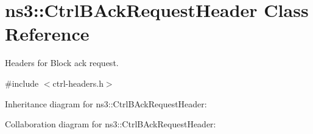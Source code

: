 \hypertarget{classns3_1_1CtrlBAckRequestHeader}{}\section{ns3\+:\+:Ctrl\+B\+Ack\+Request\+Header Class Reference}
\label{classns3_1_1CtrlBAckRequestHeader}


Headers for Block ack request.  




{\ttfamily \#include $<$ctrl-\/headers.\+h$>$}



Inheritance diagram for ns3\+:\+:Ctrl\+B\+Ack\+Request\+Header\+:


Collaboration diagram for ns3\+:\+:Ctrl\+B\+Ack\+Request\+Header\+:
